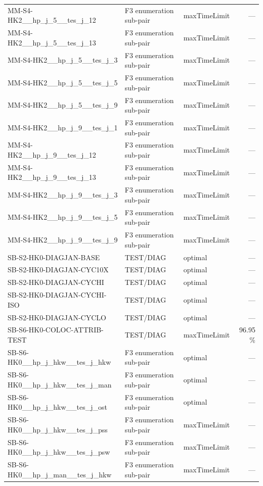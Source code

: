 \begin{table}[htbp]
\begin{tabular}{lllr}
  MM-S4-HK2\_\_hp\_j\_5\_\_tes\_j\_12 & F3 enumeration sub-pair & maxTimeLimit & — \\
  MM-S4-HK2\_\_hp\_j\_5\_\_tes\_j\_13 & F3 enumeration sub-pair & maxTimeLimit & — \\
  MM-S4-HK2\_\_hp\_j\_5\_\_tes\_j\_3 & F3 enumeration sub-pair & maxTimeLimit & — \\
  MM-S4-HK2\_\_hp\_j\_5\_\_tes\_j\_5 & F3 enumeration sub-pair & maxTimeLimit & — \\
  MM-S4-HK2\_\_hp\_j\_5\_\_tes\_j\_9 & F3 enumeration sub-pair & maxTimeLimit & — \\
  MM-S4-HK2\_\_hp\_j\_9\_\_tes\_j\_1 & F3 enumeration sub-pair & maxTimeLimit & — \\
  MM-S4-HK2\_\_hp\_j\_9\_\_tes\_j\_12 & F3 enumeration sub-pair & maxTimeLimit & — \\
  MM-S4-HK2\_\_hp\_j\_9\_\_tes\_j\_13 & F3 enumeration sub-pair & maxTimeLimit & — \\
  MM-S4-HK2\_\_hp\_j\_9\_\_tes\_j\_3 & F3 enumeration sub-pair & maxTimeLimit & — \\
  MM-S4-HK2\_\_hp\_j\_9\_\_tes\_j\_5 & F3 enumeration sub-pair & maxTimeLimit & — \\
  MM-S4-HK2\_\_hp\_j\_9\_\_tes\_j\_9 & F3 enumeration sub-pair & maxTimeLimit & — \\
  SB-S2-HK0-DIAGJAN-BASE & TEST/DIAG & optimal & — \\
  SB-S2-HK0-DIAGJAN-CYC10X & TEST/DIAG & optimal & — \\
  SB-S2-HK0-DIAGJAN-CYCHI & TEST/DIAG & optimal & — \\
  SB-S2-HK0-DIAGJAN-CYCHI-ISO & TEST/DIAG & optimal & — \\
  SB-S2-HK0-DIAGJAN-CYCLO & TEST/DIAG & optimal & — \\
  SB-S6-HK0-COLOC-ATTRIB-TEST & TEST/DIAG & maxTimeLimit & 96.95 \% \\
  SB-S6-HK0\_\_hp\_j\_hkw\_\_tes\_j\_hkw & F3 enumeration sub-pair & optimal & — \\
  SB-S6-HK0\_\_hp\_j\_hkw\_\_tes\_j\_man & F3 enumeration sub-pair & optimal & — \\
  SB-S6-HK0\_\_hp\_j\_hkw\_\_tes\_j\_ost & F3 enumeration sub-pair & optimal & — \\
  SB-S6-HK0\_\_hp\_j\_hkw\_\_tes\_j\_pss & F3 enumeration sub-pair & maxTimeLimit & — \\
  SB-S6-HK0\_\_hp\_j\_hkw\_\_tes\_j\_psw & F3 enumeration sub-pair & maxTimeLimit & — \\
  SB-S6-HK0\_\_hp\_j\_man\_\_tes\_j\_hkw & F3 enumeration sub-pair & maxTimeLimit & — \\

\end{tabular}
\end{table}
